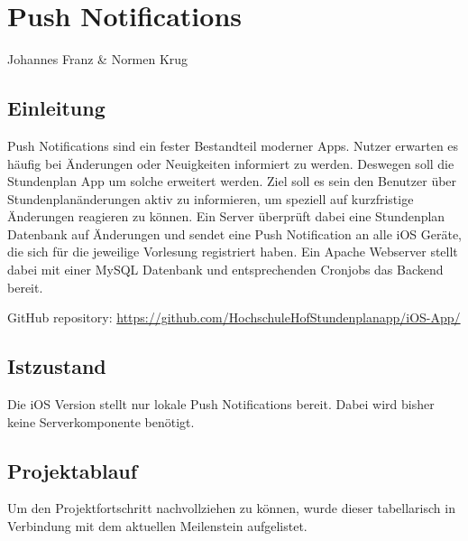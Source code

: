 \chapter{Push Notifications}
Johannes Franz \& Normen Krug

\section{Einleitung}
Push Notifications sind ein fester Bestandteil moderner Apps. Nutzer erwarten es häufig bei Änderungen oder Neuigkeiten informiert zu werden. Deswegen soll die Stundenplan App um solche erweitert werden. Ziel soll es sein den Benutzer über Stundenplanänderungen aktiv zu informieren, um speziell auf kurzfristige Änderungen reagieren zu können. Ein Server überprüft dabei eine Stundenplan Datenbank auf Änderungen und sendet eine Push Notification an alle iOS Geräte, die sich für die jeweilige Vorlesung registriert haben. Ein Apache Webserver stellt dabei mit einer MySQL Datenbank und entsprechenden Cronjobs das Backend bereit.

GitHub repository: \url{https://github.com/HochschuleHofStundenplanapp/iOS-App/}


\section{Istzustand}
Die iOS Version stellt nur lokale Push Notifications bereit. Dabei wird bisher keine Serverkomponente benötigt.

\newpage

\section{Projektablauf}
Um den Projektfortschritt nachvollziehen zu können, wurde dieser tabellarisch in Verbindung mit dem aktuellen Meilenstein aufgelistet.



